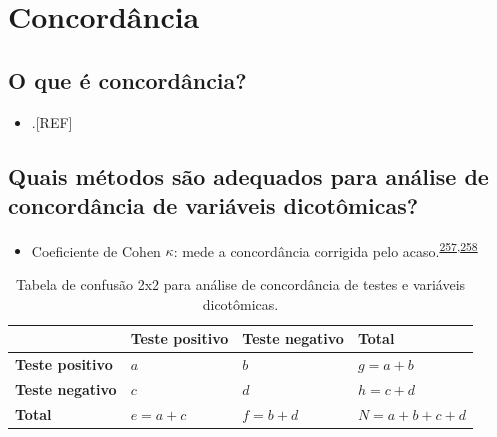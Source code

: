\documentclass[
  a4paper,
]{book}
\providecommand{\tightlist}{%
  \setlength{\itemsep}{0pt}\setlength{\parskip}{0pt}}
\begin{document}
\hypertarget{concordancia}{%
\section{Concordância}\label{concordancia}}

\hypertarget{o-que-uxe9-concorduxe2ncia}{%
\subsection{O que é concordância?}\label{o-que-uxe9-concorduxe2ncia}}

\begin{itemize}
\tightlist
\item
  .{[}REF{]}
\end{itemize}

\hypertarget{quais-muxe9todos-suxe3o-adequados-para-anuxe1lise-de-concorduxe2ncia-de-variuxe1veis-dicotuxf4micas}{%
\subsection{Quais métodos são adequados para análise de concordância de variáveis dicotômicas?}\label{quais-muxe9todos-suxe3o-adequados-para-anuxe1lise-de-concorduxe2ncia-de-variuxe1veis-dicotuxf4micas}}

\begin{itemize}
\tightlist
\item
  Coeficiente de Cohen \(\kappa\): mede a concordância corrigida pelo acaso.\textsuperscript{\protect\hyperlink{ref-scott1955}{257},\protect\hyperlink{ref-cohen1960}{258}}
\end{itemize}

\begin{table}

\caption{\label{tab:crosstable-kappa-2x2}Tabela de confusão 2x2 para análise de concordância de testes e variáveis dicotômicas.}
\centering
\begin{tabu} to 
\toprule
\textbf{ } & \textbf{Teste positivo} & \textbf{Teste negativo} & \textbf{Total}\\
\midrule
\textbf{Teste positivo} & $a$ & $b$ & $g=a+b$\\
\textbf{Teste negativo} & $c$ & $d$ & $h=c+d$\\
\textbf{Total} & $e=a+c$ & $f=b+d$ & $N=a+b+c+d$\\
\bottomrule
\end{tabu}
\end{table}
\end{document}
